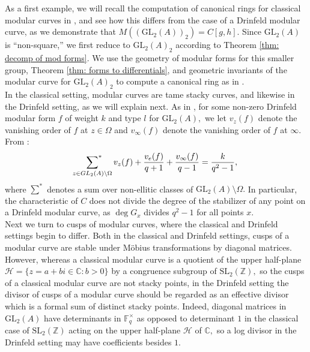 \documentclass[11pt]{amsart}
\theoremstyle{definition}
\numberwithin{equation}{section}
\newcommand{\GL}{\mathrm{GL}} 	%
\newcommand{\SL}{\mathrm{SL}} 	%
\newcommand{\cH}{\mathcal{H}}		%
\newcommand{\sX}{\mathscr{X}}		%
\newcommand{\bbC}{\mathbb{C}}		%
\newcommand{\bbF}{\mathbb{F}}		%
\newcommand{\bbZ}{\mathbb{Z}}		%
\begin{document}
As a first example, we will recall the computation of canonical rings for classical modular curves in \cite{VZB}, and see how this differs from the case of a Drinfeld modular curve, as we demonstrate that $M((\GL_2(A))_2)=C[g,h].$ Since $\GL_2(A)$ is ``non-square,'' we first reduce to $\GL_2(A)_2$ according to Theorem \ref{thm: decomp of mod forms}. We use the geometry of modular forms for this smaller group, Theorem \ref{thm: forms to differentials}, and geometric invariants of the modular curve for $\GL_2(A)_2$ to compute a canonical ring as in \cite{VZB}.\\

In the classical setting, modular curves are tame stacky curves, and likewise in the Drinfeld setting, as we will explain next. As in \cite[Definition $(3.5)$]{Gekeler-survey-Drinfeld-modular-forms}, for some non-zero Drinfeld modular form $f$ of weight $k$ and type $l$ for $\GL_2(A),$ we let $v_z(f)$ denote the vanishing order of $f$ at $z\in \Omega$ and $v_{\infty}(f)$ denote the vanishing order of $f$ at $\infty.$ From \cite[Equation $(3.10)$]{Gekeler-survey-Drinfeld-modular-forms}: 
\[\sideset{}{^*}\sum_{z\in GL_2(A)\setminus \Omega}v_z(f)+\frac{v_e(f)}{q+1}+\frac{v_{\infty}(f)}{q-1}=\frac{k}{q^2-1},\]
where $\sum^*$ denotes a sum over non-ellitic classes of $\GL_2(A)\setminus \Omega.$ In particular, the characteristic of $C$ does not divide the degree of the stabilizer of any point on a Drinfeld modular curve, as $\deg G_x$ divides $q^2-1$ for all points $x.$\\

Next we turn to cusps of modular curves, where the classical and Drinfeld settings begin to differ. 
Both in the classical and Drinfeld settings, cusps of a modular curve are stable under M\"obius transformations by diagonal matrices. However, whereas a classical modular curve is a quotient of the upper half-plane $\cH=\{z=a+bi\in \bbC: b>0\}$ by a congruence subgroup of $\SL_2(\bbZ),$ 
so the cusps of a classical modular curve are not stacky points, in the Drinfeld setting the divisor of cusps of a modular curve should be regarded as an effective divisor which is a formal sum of distinct stacky points. Indeed, diagonal matrices in $\GL_2(A)$ have determinants in $\bbF_q^{\times}$ as opposed to determinant $1$ in the classical case of $\SL_2(\bbZ)$ acting on the upper half-plane $\cH$ of $\bbC,$ so a log divisor in the Drinfeld setting may have coefficients besides $1.$\\
\end{document}
